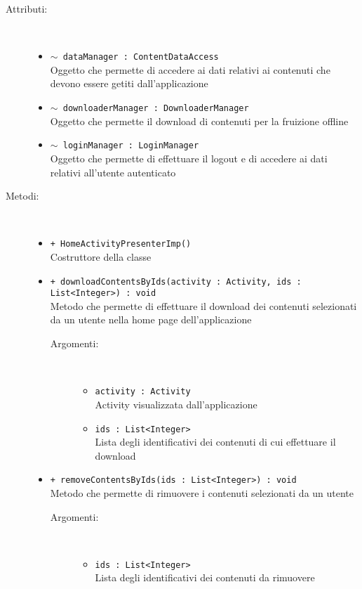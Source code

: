 \documentclass[../Tesi.tex]{subfiles}
\begin{document}
		\begin{description}
			\item[Attributi:] \
			\begin{itemize}
				\item \texttt{$\sim$ dataManager : ContentDataAccess}\\
				Oggetto che permette di accedere ai dati relativi ai contenuti che devono essere getiti dall'applicazione

				\item \texttt{$\sim$ downloaderManager : DownloaderManager}\\
				Oggetto che permette il download di contenuti per la fruizione offline

				\item \texttt{$\sim$ loginManager : LoginManager}\\
				Oggetto che permette di effettuare il logout e di accedere ai dati relativi all'utente autenticato
			\end{itemize}

			\item[Metodi:] \
			\begin{itemize}
				\item \texttt{+ HomeActivityPresenterImp()}\\
				Costruttore della classe 
				
				\item \texttt{+ downloadContentsByIds(activity : Activity, ids : \\List<Integer>) : void}\\
				Metodo che permette di effettuare il download dei contenuti selezionati da un utente nella home page dell'applicazione
				\begin{description}
					\item[Argomenti:] \
					\begin{itemize}
						\item \texttt{activity : Activity}\\
						Activity visualizzata dall'applicazione

						\item \texttt{ids : List<Integer>}\\
						Lista degli identificativi dei contenuti di cui effettuare il download
					\end{itemize}
				\end{description}

				\item \texttt{+ removeContentsByIds(ids : List<Integer>) : void}\\
				Metodo che permette di rimuovere i contenuti selezionati da un utente
				\begin{description}
					\item[Argomenti:] \
					\begin{itemize}
						\item \texttt{ids : List<Integer>}\\
						Lista degli identificativi dei contenuti da rimuovere
					\end{itemize}
				\end{description}


\end{itemize}
\end{description}
\end{document}
